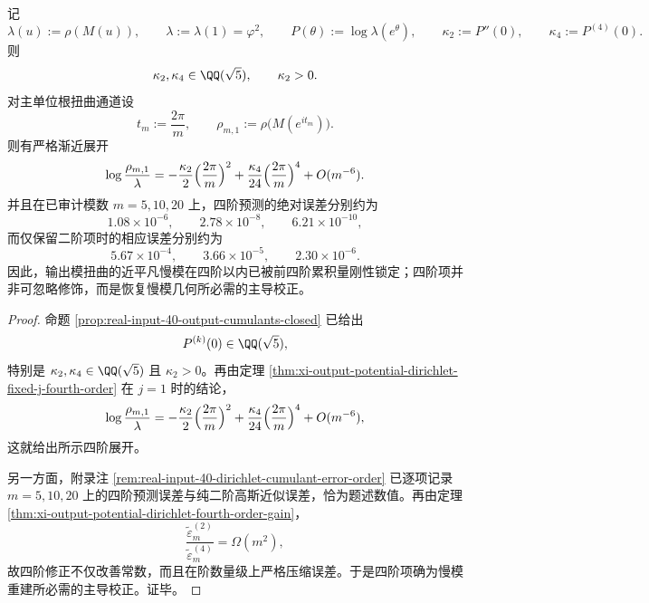 \begin{theorem}[输出模扭曲慢模的四阶累积刚性]\label{thm:xi-time-part68-output-twist-slowmode-fourth-cumulant-rigidity}
记
\[
\lambda(u):=\rho(M(u)),
\qquad
\lambda:=\lambda(1)=\varphi^2,
\qquad
P(\theta):=\log \lambda(e^\theta),
\qquad
\kappa_2:=P''(0),
\qquad
\kappa_4:=P^{(4)}(0).
\]
则
\[
\kappa_2,\kappa_4\in\QQ(\sqrt5),
\qquad
\kappa_2>0.
\]
对主单位根扭曲通道设
\[
t_m:=\frac{2\pi}{m},
\qquad
\rho_{m,1}:=\rho\!\bigl(M(e^{it_m})\bigr).
\]
则有严格渐近展开
\[
\log \frac{\rho_{m,1}}{\lambda}
=
-\frac{\kappa_2}{2}\Bigl(\frac{2\pi}{m}\Bigr)^2
+\frac{\kappa_4}{24}\Bigl(\frac{2\pi}{m}\Bigr)^4
+O(m^{-6}).
\]
并且在已审计模数 \(m=5,10,20\) 上，四阶预测的绝对误差分别约为
\[
1.08\times 10^{-6},\qquad
2.78\times 10^{-8},\qquad
6.21\times 10^{-10},
\]
而仅保留二阶项时的相应误差分别约为
\[
5.67\times 10^{-4},\qquad
3.66\times 10^{-5},\qquad
2.30\times 10^{-6}.
\]
因此，输出模扭曲的近平凡慢模在四阶以内已被前四阶累积量刚性锁定；四阶项并非可忽略修饰，而是恢复慢模几何所必需的主导校正。
\end{theorem}
\begin{proof}
命题 \ref{prop:real-input-40-output-cumulants-closed} 已给出
\[
P^{(k)}(0)\in\QQ(\sqrt5),
\]
特别是 \(\kappa_2,\kappa_4\in\QQ(\sqrt5)\) 且 \(\kappa_2>0\)。再由定理 \ref{thm:xi-output-potential-dirichlet-fixed-j-fourth-order} 在 \(j=1\) 时的结论，
\[
\log \frac{\rho_{m,1}}{\lambda}
=
-\frac{\kappa_2}{2}\Bigl(\frac{2\pi}{m}\Bigr)^2
+\frac{\kappa_4}{24}\Bigl(\frac{2\pi}{m}\Bigr)^4
+O(m^{-6}),
\]
这就给出所示四阶展开。

另一方面，附录注 \ref{rem:real-input-40-dirichlet-cumulant-error-order} 已逐项记录 \(m=5,10,20\) 上的四阶预测误差与纯二阶高斯近似误差，恰为题述数值。再由定理 \ref{thm:xi-output-potential-dirichlet-fourth-order-gain}，
\[
\frac{\widetilde\varepsilon_m^{(2)}}{\widetilde\varepsilon_m^{(4)}}=\Omega(m^2),
\]
故四阶修正不仅改善常数，而且在阶数量级上严格压缩误差。于是四阶项确为慢模重建所必需的主导校正。证毕。
\end{proof}

